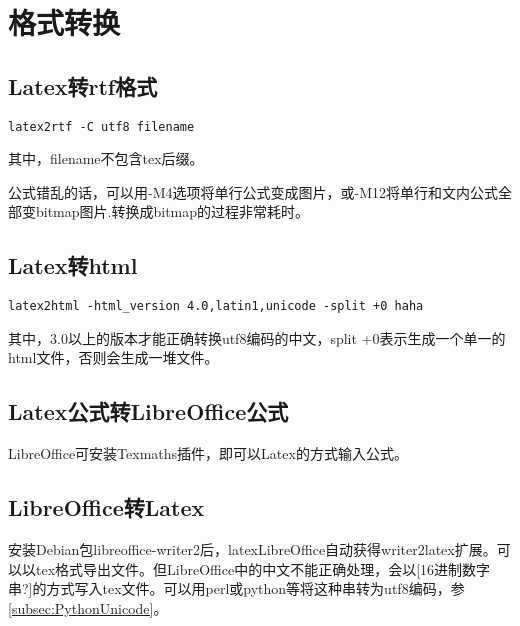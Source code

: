 
\section{格式转换}
\subsection{Latex转rtf格式}
\begin{verbatim}
latex2rtf -C utf8 filename
\end{verbatim}
其中，filename不包含tex后缀。

公式错乱的话，可以用-M4选项将单行公式变成图片，或-M12将单行和文内公式全部变bitmap图片.转换成bitmap的过程非常耗时。

\subsection{Latex转html}
\begin{verbatim}
latex2html -html_version 4.0,latin1,unicode -split +0 haha
\end{verbatim}
其中，3.0以上的版本才能正确转换utf8编码的中文，split +0表示生成一个单一的html文件，否则会生成一堆文件。

\subsection{Latex公式转LibreOffice公式}
LibreOffice可安装Texmaths插件，即可以Latex的方式输入公式。


\subsection{LibreOffice转Latex}
安装Debian包libreoffice-writer2后，latexLibreOffice自动获得writer2latex扩展。可以以tex格式导出文件。但LibreOffice中的中文不能正确处理，会以[16进制数字串?]的方式写入tex文件。可以用perl或python等将这种串转为utf8编码，参\ref{subsec:PythonUnicode}。


